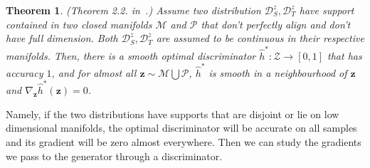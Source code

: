 \documentclass{article} \usepackage{iclr2023_conference,times}
\newtheorem{theo}{Theorem}
\newcommand{\z}{\mathbf{z}}
\newcommand{\D}{\mathcal{D}}
\begin{document}
\begin{theo}
(Theorem 2.2. in~\citep{arjovsky2017towards}.) Assume two distribution $\D^z_S,\D^z_T$ have support contained in two closed manifolds $\mathcal{M}$ and $\mathcal{P}$ that don’t perfectly align and don’t have full dimension. Both $\D^z_S,\D^z_T$ are assumed to be  continuous in their respective manifolds. Then, there is a smooth optimal discriminator  $\hat{h}^*:\mathcal{Z}\rightarrow[0,1]$ that has accuracy $1$, and for almost all $\z\sim\mathcal{M}\bigcup \mathcal{P}$, $\hat{h}^*$ is smooth in a neighbourhood of $\z$ and $\nabla_\z \hat{h}^*(\z)=0$.
\label{theo:stable2}
\end{theo}

Namely, if the two distributions have supports that are disjoint or lie on low dimensional manifolds, the optimal discriminator will be accurate on all samples and its gradient will be zero almost everywhere. Then we can study the gradients we pass to the generator through a discriminator. 
\end{document}

